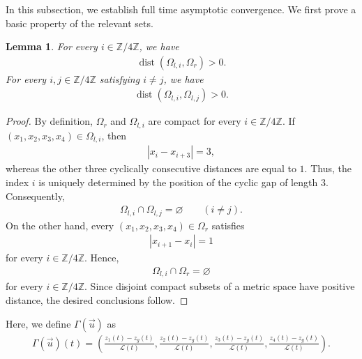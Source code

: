 \documentclass[10pt,a4paper]{amsart}
\newtheorem{lemma}[theorem]{Lemma}
\numberwithin{equation}{section}
\begin{document}
In this subsection, we establish full time asymptotic convergence. We first prove a basic property of the relevant sets.
\begin{lemma}\label{setlemma}
For every $i\in\mathbb{Z}/4\mathbb{Z}$, we have
\begin{align*}
\operatorname{dist}\left(\Omega_{l,i},\Omega_r\right)>0.
\end{align*}
For every $i,j\in\mathbb{Z}/4\mathbb{Z}$ satisfying $i\neq j$, we have
\begin{align*}
\operatorname{dist}\left(\Omega_{l,i},\Omega_{l,j}\right)>0.
\end{align*}
\end{lemma}
\begin{proof}
By definition, $\Omega_r$ and $\Omega_{l,i}$ are compact for every $i\in\mathbb{Z}/4\mathbb{Z}$. If $(x_1,x_2,x_3,x_4)\in\Omega_{l,i}$, then
\begin{align*}
|x_i-x_{i+3}|=3,
\end{align*}
whereas the other three cyclically consecutive distances are equal to $1$. Thus, the index $i$ is uniquely determined by the position of the cyclic gap of length $3$. Consequently,
\begin{align*}
\Omega_{l,i}\cap\Omega_{l,j}=\varnothing
\qquad (i\neq j).
\end{align*}
On the other hand, every $(x_1,x_2,x_3,x_4)\in\Omega_r$ satisfies
\begin{align*}
|x_{i+1}-x_i|=1
\end{align*}
for every $i\in\mathbb{Z}/4\mathbb{Z}$. Hence,
\begin{align*}
\Omega_{l,i}\cap\Omega_r=\varnothing
\end{align*}
for every $i\in\mathbb{Z}/4\mathbb{Z}$. Since disjoint compact subsets of a metric space have positive distance, the desired conclusions follow.
\end{proof}

Here, we define $\Gamma(\vec{u})$ as 
\begin{align}\label{Gammaudef}
\Gamma(\vec{u})(t)=\left(\frac{z_1(t)-z_g(t)}{\mathcal{L}(t)},\frac{z_2(t)-z_g(t)}{\mathcal{L}(t)},\frac{z_3(t)-z_g(t)}{\mathcal{L}(t)},\frac{z_4(t)-z_g(t)}{\mathcal{L}(t)}\right).
\end{align}
\end{document}
